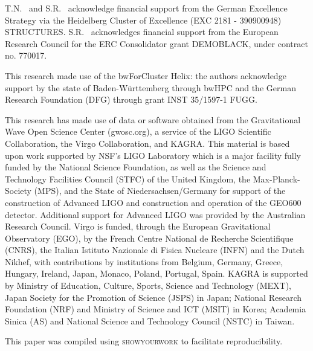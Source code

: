 \documentclass[aps,prd,twocolumn,superscriptaddress,preprintnumbers,nofootinbib,hidelinks]{revtex4-2}
\begin{document}
\begin{acknowledgments}
T.N.~ and S.R.~ acknowledge financial support from the German Excellence Strategy via the Heidelberg Cluster of Excellence (EXC 2181 - 390900948) STRUCTURES.
S.R.~ acknowledges financial support from the European Research Council for the ERC Consolidator grant DEMOBLACK, under contract no. 770017. 

This research made use of the bwForCluster Helix: the authors acknowledge support by the state of Baden-Württemberg through bwHPC and the German Research Foundation (DFG) through grant INST 35/1597-1 FUGG.

This research has made use of data or software obtained from the Gravitational Wave Open Science Center (gwosc.org), a service of the LIGO Scientific Collaboration, the Virgo Collaboration, and KAGRA. This material is based upon work supported by NSF's LIGO Laboratory which is a major facility fully funded by the National Science Foundation, as well as the Science and Technology Facilities Council (STFC) of the United Kingdom, the Max-Planck-Society (MPS), and the State of Niedersachsen/Germany for support of the construction of Advanced LIGO and construction and operation of the GEO600 detector. Additional support for Advanced LIGO was provided by the Australian Research Council. Virgo is funded, through the European Gravitational Observatory (EGO), by the French Centre National de Recherche Scientifique (CNRS), the Italian Istituto Nazionale di Fisica Nucleare (INFN) and the Dutch Nikhef, with contributions by institutions from Belgium, Germany, Greece, Hungary, Ireland, Japan, Monaco, Poland, Portugal, Spain. KAGRA is supported by Ministry of Education, Culture, Sports, Science and Technology (MEXT), Japan Society for the Promotion of Science (JSPS) in Japan; National Research Foundation (NRF) and Ministry of Science and ICT (MSIT) in Korea; Academia Sinica (AS) and National Science and Technology Council (NSTC) in Taiwan.

This paper was compiled using \textsc{showyourwork} \cite{Luger2021} to facilitate reproducibility.

\end{acknowledgments}


\end{document}
